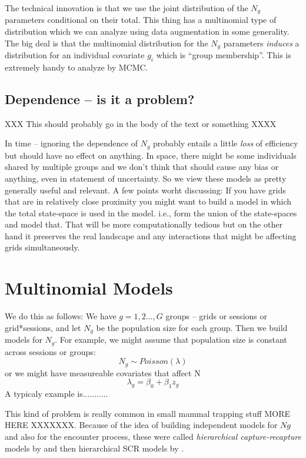 The technical innovation is that we use the joint distribution of the
$N_{g}$ parameters conditional on their total. This thing has a
multinomial type of distribution which we can analyze using data
augmentation in some generality.  The big deal is that the multinomial
distribution for the $N_{g}$ parameters {\it induces} a distribution
for an individual covariate $g_{i}$ which is ``group membership''. 
This is extremely handy to analyze by MCMC.

\subsection{Dependence -- is it a problem?}

XXX This should probably go in the body of the text or something XXXX

In time -- ignoring the dependence of $N_{g}$ probably entails a
little {\it loss} of efficiency but should have no effect on anything.
In space, there might be some individuals shared by multiple groups
and we don't think that should cause any bias or anything, even in
statement of uncertainty. So we view these models as pretty generally
useful and relevant.
A few points worht discussing: If you have grids that are in
relatively close proximity you might want to build a model in which
the total state-space is used in the model. i.e., form the union of
the state-spaces and model that. That will be more computationally
tedious but on the other hand it preserves the real landscape and any
interactions that might be affecting grids simultaneously. 


\section{Multinomial Models}

We do this as follows: We have $g=1,2\ldots, G$ groups -- grids or
sessions or grid*sessions, and let $N_{g}$ be the population size for
each group. Then we build models for $N_{g}$. For example, we might
assume that population size is constant across sessions or groups:
\[
 N_{g} \sim Poisson(\lambda)
\]
or we might have measureable covariates that affect N
\[
 \lambda_{g} = \beta_{0} + \beta_{1} z_{g}
\]
A typicaly example is...........


This kind of problem is really common in small mammal trapping stuff
\citep{converse_royle:xxxx} MORE HERE XXXXXXX.
Because of the idea of building independent models for $Ng$ and also
for the encounter process, these were called 
{\it hierarchical capture-recapture} models by \citep{royle_etal:2013}
and then hierarchical SCR models by \citep{converse_royle:2013}. 

